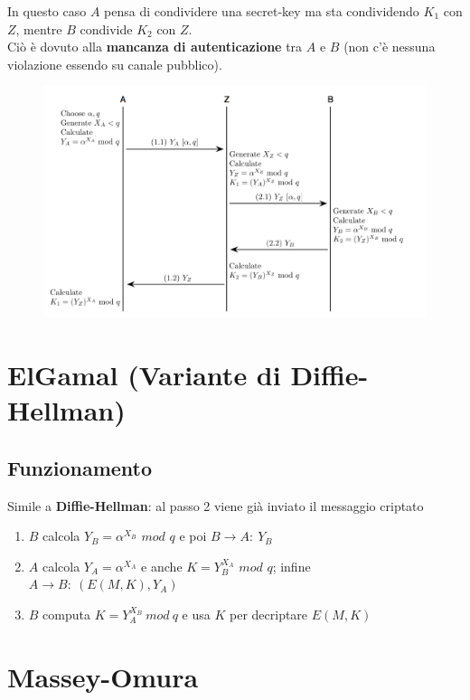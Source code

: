 \documentclass[11pt, a4paper, twoside, italian]{report}
\theoremstyle{plain}
\begin{document}
\noindent
In questo caso $A$ pensa di condividere una secret-key ma sta condividendo $K_1$ con $Z$, mentre $B$ condivide $K_2$ con $Z$.\\
Ciò è dovuto alla \textbf{mancanza di autenticazione} tra $A$ e $B$ (non c'è nessuna violazione essendo su canale pubblico).

\begin{figure}[H]
	\centering
	\includegraphics[scale=0.6]{diffiehellmanmitm}
\end{figure}


\section*{ElGamal (Variante di Diffie-Hellman)}
\subsection*{Funzionamento}
Simile a \textbf{Diffie-Hellman}: al passo 2 viene già inviato il messaggio criptato
	\begin{enumerate}
		\item $B$ calcola $Y_B=\alpha^{X_B}$ $mod$ $q$ e poi $B \longrightarrow A:\ Y_{B}$
		\item $A$ calcola $Y_A=\alpha^{X_A}$ e anche $K=Y_B^{X_A}$ $mod$ $q$; infine $A \longrightarrow B:\ (E(M,K), Y_{A})$
		\item $B$ computa $K = Y_{A}^{X_{B}}\ mod\ q$ e usa $K$ per decriptare $E(M,K)$ 
	\end{enumerate}

\section*{Massey-Omura}
\end{document}
